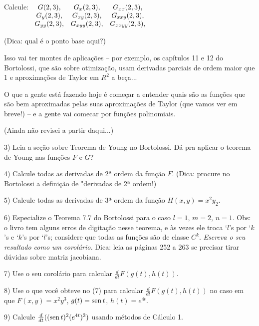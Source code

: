 \documentclass[oneside,12pt]{article}
\begin{document}
\msk

Calcule:
%
$\begin{array}[t]{cccccccc}
 G(2,3),      & G_x(2,3),     & G_{xx}(2,3), \\
 G_y(2,3),    & G_{xy}(2,3),  & G_{xxy}(2,3), \\
 G_{yy}(2,3), & G_{xyy}(2,3), & G_{xxyy}(2,3), \\
 \end{array}
$

\msk

(Dica: qual é o ponto base aqui?)

\newpage

Isso vai ter montes de aplicações -- por exemplo, os capítulos 11 e 12
do Bortolossi, que são sobre otimização, usam derivadas parciais de
ordem maior que 1 e aproximações de Taylor em $R^2$ a beça...

O que a gente está fazendo hoje é começar a entender quais são as
funções que são bem aproximadas pelas suas aproximações de Taylor (que
vamos ver em breve!) -- e a gente vai comecar por funções polinomiais.


\newpage

(Ainda não revisei a partir daqui...)

\msk


3) Leia a seção sobre Teorema de Young no Bortolossi. Dá pra aplicar o
teorema de Young nas funções $F$ e $G$?

\msk

4) Calcule todas as derivadas de 2ª ordem da função $F$. (Dica:
procure no Bortolossi a definição de "derivadas de 2ª ordem!)

\msk

5) Calcule todas as derivadas de 3ª ordem da função $H(x,y) = x^2 y_2$.

\msk

6) Especialize o Teorema 7.7 do Bortolossi para o caso $l=1$, $m=2$,
$n=1$. Obs: o livro tem alguns erros de digitação nesse teorema, e às
vezes ele troca `$l$'s por `$k$'s e `$k$'s por `$l$'s; considere que
todas as funções são de classe $C^k$. {\sl Escreva o seu resultado
  como um corolário.} Dica: leia as páginas 252 a 263 se precisar
tirar dúvidas sobre matriz jacobiana.

\msk

7) Use o seu corolário para calcular $\frac{d}{dt} F(g(t),h(t))$.

\msk

8) Use o que você obteve no (7) para calcular $\frac{d}{dt}
F(g(t),h(t))$ no caso em que $F(x,y) = x^2y^3$, $g(t) = \operatorname{sen} t$, $h(t)
= e^{4t}$.

\msk

9) Calcule $\frac{d}{dt} ((\operatorname{sen} t)^2(e^{4t})^3)$ usando métodos de
Cálculo 1.


\end{document}

